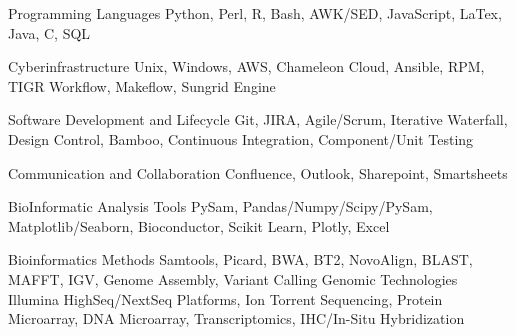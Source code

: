 

\begin{cvskills}

  \cvskill
    {Programming Languages} %
    {Python, Perl, R, Bash, AWK/SED, JavaScript, LaTex, Java, C, SQL} %

  \cvskill
    {Cyberinfrastructure} %
    {Unix, Windows, AWS, Chameleon Cloud, Ansible, RPM, TIGR Workflow, Makeflow, Sungrid Engine} %

  \cvskill
    {Software Development and Lifecycle} %
    {Git, JIRA, Agile/Scrum, Iterative Waterfall, Design Control, Bamboo, Continuous Integration, Component/Unit Testing} %

    \cvskill
    {Communication and Collaboration}
    {Confluence, Outlook, Sharepoint, Smartsheets}

  \cvskill
    {BioInformatic Analysis Tools} %
    {PySam, Pandas/Numpy/Scipy/PySam, Matplotlib/Seaborn, Bioconductor, Scikit Learn, Plotly, Excel} %

  \cvskill
    {Bioinformatics Methods} %
    {Samtools, Picard, BWA, BT2, NovoAlign, BLAST, MAFFT, IGV, Genome Assembly, Variant Calling} %
  \cvskill
    {Genomic Technologies} %
    {Illumina HighSeq/NextSeq Platforms, Ion Torrent Sequencing, Protein Microarray, DNA Microarray, Transcriptomics, IHC/In-Situ Hybridization} %






\end{cvskills}
